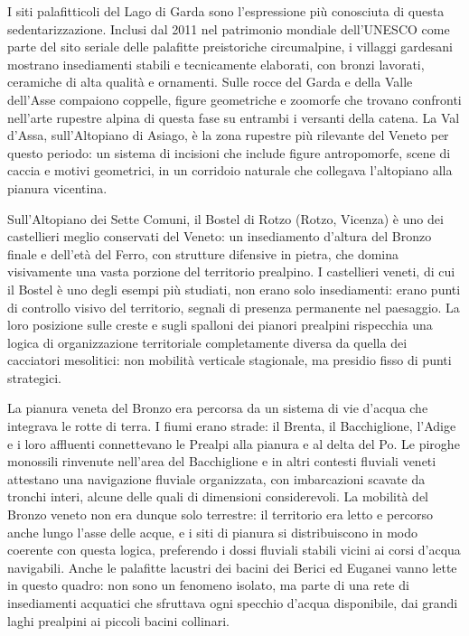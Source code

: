 I siti palafitticoli del Lago di Garda sono l'espressione più conosciuta di questa sedentarizzazione. Inclusi dal 2011 nel patrimonio mondiale dell'UNESCO come parte del sito seriale delle palafitte preistoriche circumalpine, i villaggi gardesani mostrano insediamenti stabili e tecnicamente elaborati, con bronzi lavorati, ceramiche di alta qualità e ornamenti. Sulle rocce del Garda e della Valle dell'Asse compaiono coppelle, figure geometriche e zoomorfe che trovano confronti nell'arte rupestre alpina di questa fase su entrambi i versanti della catena. La Val d'Assa, sull'Altopiano di Asiago, è la zona rupestre più rilevante del Veneto per questo periodo: un sistema di incisioni che include figure antropomorfe, scene di caccia e motivi geometrici, in un corridoio naturale che collegava l'altopiano alla pianura vicentina.

Sull'Altopiano dei Sette Comuni, il Bostel di Rotzo (Rotzo, Vicenza) è uno dei castellieri meglio conservati del Veneto: un insediamento d'altura del Bronzo finale e dell'età del Ferro, con strutture difensive in pietra, che domina visivamente una vasta porzione del territorio prealpino. I castellieri veneti, di cui il Bostel è uno degli esempi più studiati, non erano solo insediamenti: erano punti di controllo visivo del territorio, segnali di presenza permanente nel paesaggio. La loro posizione sulle creste e sugli spalloni dei pianori prealpini rispecchia una logica di organizzazione territoriale completamente diversa da quella dei cacciatori mesolitici: non mobilità verticale stagionale, ma presidio fisso di punti strategici.

La pianura veneta del Bronzo era percorsa da un sistema di vie d'acqua che integrava le rotte di terra. I fiumi erano strade: il Brenta, il Bacchiglione, l'Adige e i loro affluenti connettevano le Prealpi alla pianura e al delta del Po. Le piroghe monossili rinvenute nell'area del Bacchiglione e in altri contesti fluviali veneti attestano una navigazione fluviale organizzata, con imbarcazioni scavate da tronchi interi, alcune delle quali di dimensioni considerevoli. La mobilità del Bronzo veneto non era dunque solo terrestre: il territorio era letto e percorso anche lungo l'asse delle acque, e i siti di pianura si distribuiscono in modo coerente con questa logica, preferendo i dossi fluviali stabili vicini ai corsi d'acqua navigabili. Anche le palafitte lacustri dei bacini dei Berici ed Euganei vanno lette in questo quadro: non sono un fenomeno isolato, ma parte di una rete di insediamenti acquatici che sfruttava ogni specchio d'acqua disponibile, dai grandi laghi prealpini ai piccoli bacini collinari.


